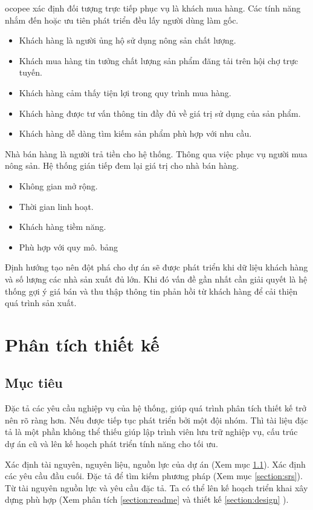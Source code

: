 \documentclass[11pt]{report}
\begin{document}
\gls{ocopee} xác định đối tượng trực tiếp phục vụ là khách mua hàng. Các tính năng nhắm đến hoặc ưu tiên phát triển đều lấy người dùng làm gốc.

\begin{itemize}
\item Khách hàng là người ủng hộ sử dụng nông sản chất lượng.
\item Khách mua hàng tin tưởng chất lượng sản phẩm đăng tải trên hội chợ trực tuyến.
\item Khách hàng cảm thấy tiện lợi trong quy trình mua hàng.
\item Khách hàng được tư vấn thông tin đầy đủ về giá trị sử dụng của sản phẩm.
\item Khách hàng dễ dàng tìm kiếm sản phẩm phù hợp với nhu cầu.
\end{itemize}
Nhà bán hàng là người trả tiền cho hệ thống. Thông qua việc phục vụ người mua nông sản. Hệ thống gián tiếp đem lại giá
trị cho nhà bán hàng.
\begin{itemize}
\item Không gian mở rộng.
\item Thời gian linh hoạt.
\item Khách hàng tiềm năng.
\item Phù hợp với quy mô.
bảng
\end{itemize}

Định hướng tạo nên đột phá cho dự án sẽ được phát triển khi dữ liệu khách hàng và số lượng các nhà sản xuất đủ lớn. Khi đó vấn đề gần nhất cần giải quyết là hệ thống gợi ý giá bán và thu thập thông tin phản hồi từ khách hàng để cải thiện quá trình sản xuất.



\chapter{Phân tích thiết kế}
\section{Mục tiêu}\label{section:resource}
Đặc tả các yêu cầu nghiệp vụ của hệ thống, giúp quá trình phân tích thiết kế trở nên rõ ràng hơn. Nếu được tiếp tục phát triển bởi một đội nhóm. Thì tài liệu đặc tả là một phần không thể thiếu giúp lập trình viên lưu trữ nghiệp vụ, cấu trúc dự án cũ và lên kế hoạch phát triển tính năng cho tối ưu.

Xác định tài nguyên, nguyên liệu, nguồn lực của dự án (Xem mục \ref{section:resource}). Xác định các yêu cầu đầu cuối. Đặc tả để tìm kiếm phương pháp (Xem mục \ref{section:srs}). Từ tài nguyên nguồn lực và yêu cầu đặc tả. Ta có thể lên kế hoạch triển khai xây dựng phù hợp (Xem phân tích \ref{section:readme} và thiết kế \ref{section:design} ).
\end{document}
